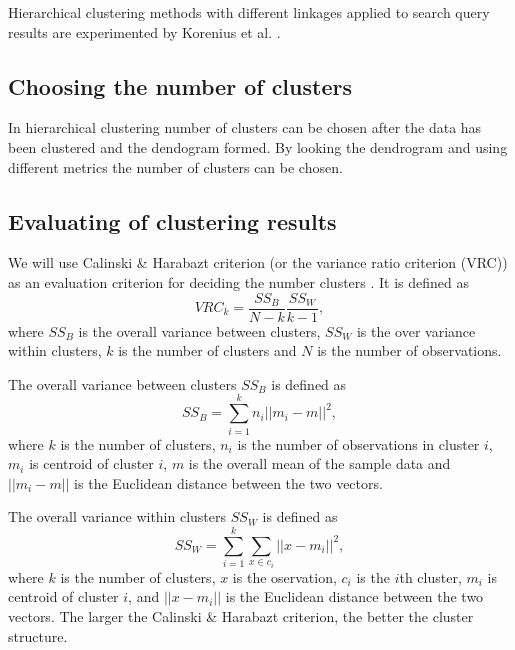 Hierarchical clustering methods with different linkages applied 
to search query results are experimented by Korenius et al. 
\cite{korenius_hierarchical_2006}.



\subsection{Choosing the number of clusters}

In hierarchical clustering number of clusters can be chosen after 
the data has been clustered and the dendogram 
 formed.
 By 
looking the dendrogram and using different metrics the number of 
clusters can be chosen.


\subsection{Evaluating of clustering results}
We will use Calinski \& Harabazt criterion (or the variance ratio 
criterion (VRC)) as an evaluation criterion for 
deciding the number clusters \cite{calinski_dendrite_1974}. It 
is defined as
\begin{equation}
 VRC_k = \frac{SS_B}{N-k} \frac{SS_W}{k-1},
\end{equation}
where $SS_B$ is the overall variance between clusters, $SS_W$ is 
the over variance within clusters, $k$ is the number of clusters 
and $N$ is the number of observations.

The overall variance between clusters $SS_B$ is defined as
\begin{equation}
 SS_B = \sum_{i=1}^k n_i ||m_i-m||^2,
\end{equation}
where $k$ is the number of clusters, $n_i$ is the number of 
observations in cluster $i$, $m_i$ is centroid of cluster $i$, 
$m$ is the overall mean of the sample data and $||m_i-m||$ is the 
Euclidean distance between the two vectors.

The overall variance within clusters $SS_W$ is defined as
\begin{equation}
 SS_W = \sum_{i=1}^k \sum_{x\in c_i} ||x-m_i||^2,
\end{equation}
where $k$ is the number of clusters, $x$ is the oservation, 
$c_i$ is the $i$th cluster, $m_i$ is centroid of cluster $i$, and 
$||x-m_i||$ is the Euclidean distance between the two vectors.
The larger the Calinski \& Harabazt criterion, the better the 
cluster structure.



